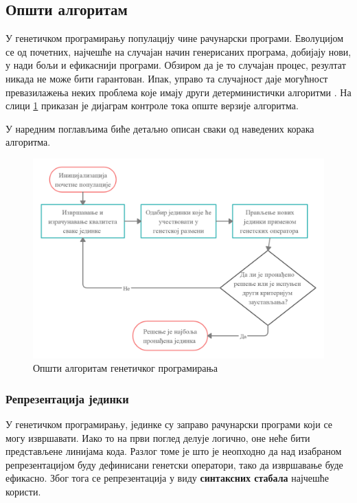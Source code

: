 \documentclass[a4paper]{article}
\begin{document}
\subsection{Општи алгоритам}

У генетичком програмирању популацију чине рачунарски програми. Еволуцијом се од почетних, најчешће на случајан начин генерисаних програма, добијају нови, у нади бољи и ефикаснији програми. Обзиром да је то случајан процес, резултат никада не може бити гарантован. Ипак, управо та случајност даје могућност превазилажења неких проблема које имају други детерминистички алгоритми \cite{fieldGuidetoGP}. На слици \ref{fig:kontrola_toka} приказан је дијаграм контроле тока опште верзије алгоритма. \newline

У наредним поглављима биће детаљно описан сваки од наведених корака алгоритма.

\begin{figure}[h!]
    \begin{center}
        \includegraphics[scale=0.22]{opstiAlgoritam.png}
    \end{center}
    \caption{Општи алгоритам генетичког програмирања}
    \label{fig:kontrola_toka}
\end{figure}

\subsubsection{Репрезентација јединки}

У генетичком програмирању, јединке су заправо рачунарски програми који се могу извршавати. Иако то на први поглед делује логично, оне неће бити представљене линијама кода. Разлог томе је што је неопходно да над изабраном репрезентацијом буду дефинисани генетски оператори, тако да извршавање буде ефикасно. Због тога се репрезентација у виду \textbf{синтаксних стабала} \cite{synTrees} најчешће користи.\newline
\end{document}

